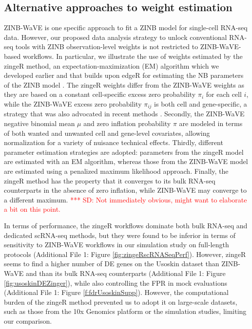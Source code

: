 \documentclass{bmcart}
\newcommand{\RPack}[1]{\textsf{#1}}
\newcommand{\sd}[1]{\textcolor{red}{*** SD: #1}}
\begin{document}
\subsection*{Alternative approaches to weight estimation}

ZINB-WaVE is one specific approach to fit a ZINB model for single-cell RNA-seq data. However, our proposed data analysis strategy to unlock conventional RNA-seq tools with ZINB observation-level weights is not restricted to ZINB-WaVE-based workflows. In particular, we illustrate the use of weights estimated by the \RPack{zingeR} method, an expectation-maximization (EM) algorithm which we developed earlier and that builds upon \RPack{edgeR} for estimating the NB parameters of the ZINB model \citep{VandenBerge2017a}. The \RPack{zingeR} weights differ from the ZINB-WaVE weights as they are based on a constant cell-specific excess zero probability $\pi_i$ for each cell $i$, while the ZINB-WaVE excess zero probability $\pi_{ij}$ is both cell and gene-specific, a strategy that was also advocated in recent methods \citep{Pierson2015,Finak2015}. Secondly, the ZINB-WaVE negative binomial mean $\mu$ and zero inflation probability $\pi$ are modeled in terms of both wanted and unwanted cell and gene-level covariates, allowing normalization for a variety of nuisance technical effects. Thirdly, different parameter estimation strategies are adopted: parameters from the \RPack{zingeR} model are estimated with an EM algorithm, whereas those from the ZINB-WaVE model are estimated using a penalized maximum likelihood approach. Finally, the \RPack{zingeR} method has the property that it converges to its bulk RNA-seq counterparts in the absence of zero inflation, while ZINB-WaVE may converge to a different maximum. \sd{Not immediately obvious, might want to elaborate a bit on this point.}

In terms of performance, the \RPack{zingeR} workflows dominate both bulk RNA-seq and dedicated scRNA-seq methods, but they were found to be inferior in terms of sensitivity to ZINB-WaVE workflows in our simulation study on full-length protocols (Additional File 1: Figure \ref{fig:zingeRscRNASeqPerf}). However, \RPack{zingeR} seems to find a higher number of DE genes on the Usoskin dataset than ZINB-WaVE and than its bulk RNA-seq counterparts (Additional File 1: Figure \ref{fig:usoskinDEZinger}), while also controlling the FPR in mock evaluations (Additional File 1: Figure \ref{f:fdrUsoskinSupp}). However, the computational burden of the \RPack{zingeR} method prevented us to adopt it on large-scale datasets, such as those from the 10x Genomics platform or the simulation studies, limiting our comparison.
\end{document}
